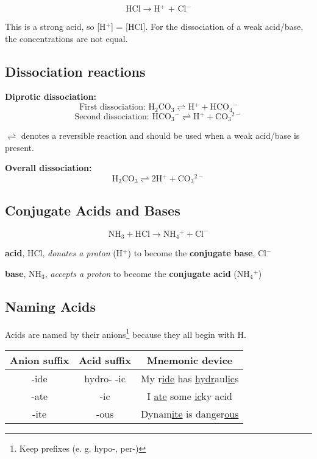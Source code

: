 \documentclass[a4paper, 12pt]{article}
\begin{document}
$$ \text{HCl} \longrightarrow \text{H$^+$ + Cl$^-$}$$

This is a strong acid, so [H$^+$] = [HCl]. For the dissociation of a weak acid/base, the concentrations are not equal.

\subsection*{Dissociation reactions}

\textbf{Diprotic dissociation:}
$$\text{First dissociation: H$_2$CO$_3$}\rightleftharpoons \text{H$^+$} + \text{HCO$_4$$^-$}$$
$$\text{Second dissociation: HCO$_3$$^-$} \rightleftharpoons \text{H$^+$} + \text{CO$_3$$^{2-}$}$$

$\rightleftharpoons$ denotes a reversible reaction and should be used when a weak acid/base is present.

\textbf{Overall dissociation:}
$$\text{H$_2$CO$_3$}\rightleftharpoons \text{2H$^+$} + \text{CO$_3$$^{2-}$}$$

\subsection*{Conjugate Acids and Bases}

$$\text{NH}_3 + \text{HCl} \longrightarrow \text{NH$_4$$^+$} + \text{Cl}^-$$

\textbf{acid}, HCl, \textit{donates a proton} (H$^+$) to become the \textbf{conjugate base}, Cl$^-$

\textbf{base}, NH$_3$, \textit{accepts a proton} to become the \textbf{conjugate acid} (NH$_4$$^+$)

\subsection*{Naming Acids}
Acids are named by their anions\footnote{Keep prefixes (e. g. hypo-, per-)} because they all begin with H.

\begin{table}[H]
    \centering
    \begin{tabular}{c|c|c}
        \textbf{Anion suffix} & \textbf{Acid suffix} & \textbf{Mnemonic device} \\\hline
        -ide & hydro- -ic & My r\underline{ide} has \underline{hydr}aul\underline{ic}s\\
        -ate & -ic & I \underline{ate} some \underline{ic}ky acid \\
        -ite & -ous & Dynam\underline{ite} is danger\underline{ous}\\ 
    \end{tabular}
    \label{tab:namingacids}
\end{table}
\end{document}
